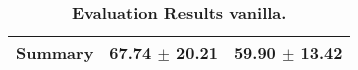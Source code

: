 \begin{table}[htb]
{\begin{tabular}{lll}
\midrule
\textbf{Summary                                  } &                  \phantom{0}67.74 $\pm$ 20.21 &                       \phantom{0}59.90 $\pm$ 13.42 \\
\bottomrule
\end{tabular}%
}
\caption{\textbf{Evaluation Results vanilla.}}
\label{tab:eval-results}
\end{table}
